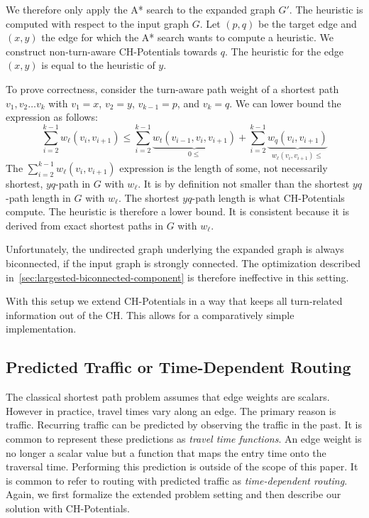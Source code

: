 \documentclass[letterpaper]{article} %
\begin{document}
We therefore only apply the A* search to the expanded graph $G'$.
The heuristic is computed with respect to the input graph $G$.
Let $(p,q)$ be the target edge and $(x,y)$ the edge for which the A* search wants to compute a heuristic.
We construct non-turn-aware CH-Potentials towards $q$.
The heuristic for the edge $(x,y)$ is equal to the heuristic of $y$.

To prove correctness, consider the turn-aware path weight of a shortest path $v_1,v_2\ldots v_k$ with $v_1=x$, $v_2=y$, $v_{k-1}=p$, and $v_k=q$.
We can lower bound the expression as follows:
\[
\sum_{i=2}^{k-1} w_\ell(v_i,v_{i+1}) \le \sum_{i=2}^{k-1} \underbrace{w_t(v_{i-1},v_i,v_{i+1})}_{0\le} + \sum_{i=2}^{k-1} \underbrace{w_q(v_i,v_{i+1})}_{w_\ell(v_i,v_{i+1})\le}
\]
The $\sum_{i=2}^{k-1} w_\ell(v_i,v_{i+1})$ expression is the length of some, not necessarily shortest, $yq$-path in $G$ with $w_\ell$.
It is by definition not smaller than the shortest $yq$-path length in $G$ with $w_\ell$.
The shortest $yq$-path length is what CH-Potentials compute.
The heuristic is therefore a lower bound.
It is consistent because it is derived from exact shortest paths in $G$ with $w_\ell$.

Unfortunately, the undirected graph underlying the expanded graph is always biconnected, if the input graph is strongly connected.
The optimization described in~\ref{sec:largested-biconnected-component} is therefore ineffective in this setting.

With this setup we extend CH-Potentials in a way that keeps all turn-related information out of the CH.
This allows for a comparatively simple implementation.

\subsection{Predicted Traffic or Time-Dependent Routing}
\label{sec:predicted-traffic}

The classical shortest path problem assumes that edge weights are scalars.
However in practice, travel times vary along an edge.
The primary reason is traffic.
Recurring traffic can be predicted by observing the traffic in the past.
It is common \cite{bgsv-mtdtt-13,bdpw-dtdrp-16,swz-sfert-19} to represent these predictions as \emph{travel time functions}.
An edge weight is no longer a scalar value but a function that maps the entry time onto the traversal time.
Performing this prediction is outside of the scope of this paper.
It is common to refer to routing with predicted traffic as \emph{time-dependent routing}.
Again, we first formalize the extended problem setting and then describe our solution with CH-Potentials.
\end{document}
